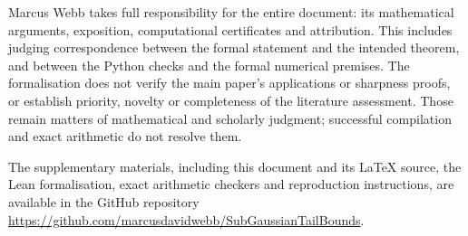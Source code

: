 \documentclass[11pt,a4paper]{article}
\numberwithin{equation}{section}
\begin{document}
Marcus Webb takes full responsibility for the entire document: its mathematical
arguments, exposition, computational certificates and attribution. This includes
judging correspondence between the formal statement and the intended theorem,
and between the Python checks and the formal numerical premises. The
formalisation does not verify the main paper's applications or sharpness proofs,
or establish priority, novelty or completeness of the literature assessment.
Those remain matters of mathematical and scholarly judgment; successful
compilation and exact arithmetic do not resolve them.

The supplementary materials, including this document and its LaTeX source,
the Lean formalisation, exact arithmetic checkers and reproduction instructions,
are available in the GitHub repository
\url{https://github.com/marcusdavidwebb/SubGaussianTailBounds}.



\end{document}
